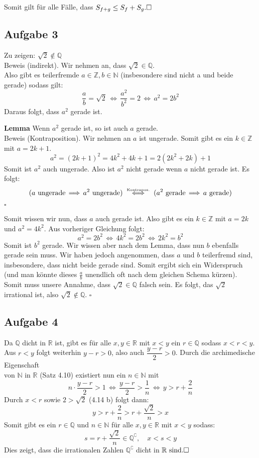 \documentclass[a4paper,graphics,11pt]{article}
\newcommand{\aufgabe}[1]{\subsection*{Aufgabe #1}}
\newcommand{\up}[2]{\mathrel{\overset{\makebox[0pt]{\mbox{\normalfont\tiny #2}}}{#1}}}
\begin{document}
Somit gilt für alle Fälle, dass $S_{f+g} \leq S_f + S_g.\hfill\square$
\aufgabe{3}
Zu zeigen: $\sqrt{2} \notin \mathbb{Q}$\\
Beweis (indirekt). Wir nehmen an, dass $\sqrt{2} \in \mathbb{Q}$.\\
Also gibt es teilerfremde $a \in \mathbb{Z} ,b \in \mathbb{N}$ (insbesondere sind nicht a und beide gerade) sodass gilt:
$$
    \frac{a}{b} = \sqrt{2} \,\Longleftrightarrow\, \frac{a^2}{b^2} = 2
    \,\Longleftrightarrow\, a^2 = 2b^2
$$
Daraus folgt, dass $a^2$ gerade ist.

\textbf{Lemma} Wenn $a^2$ gerade ist, so ist auch $a$ gerade.\\
Beweis (Kontraposition). Wir nehmen an $a$ ist ungerade. Somit gibt es ein $k \in \mathbb{Z}$ mit $a = 2k+1$.\\
$$
    a^2 = (2k+1)^2 = 4k^2+4k+1 = 2(2k^2+2k) + 1
$$
Somit ist $a^2$ auch ungerade. Also ist $a^2$ nicht gerade wenn $a$ nicht gerade ist.
Es folgt:
$$
    (a\ \text{ungerade} \,\Longrightarrow\, a^2\ \text{ungerade})
    \up{\quad\Longleftrightarrow\quad}{Kontrapos.}(a^2\ \text{gerade} \,\Longrightarrow\, a\ \text{gerade})
$$
\strut\hfill$\square$

Somit wissen wir nun, dass $a$ auch gerade ist. Also gibt es ein $k \in \mathbb{Z}$ mit
$a = 2k$ und $a^2 = 4k^2$. Aus vorheriger Gleichung folgt:
$$
    a^2 = 2b^2 \,\Longleftrightarrow\, 4k^2 = 2b^2 \,\Longleftrightarrow\, 2k^2 = b^2 
$$
Somit ist $b^2$ gerade. Wir wissen aber nach dem Lemma, dass nun $b$ ebenfalls gerade
sein muss. Wir haben jedoch angenommen, dass $a$ und $b$ teilerfremd sind, insbesondere,
dass nicht beide gerade sind.
Somit ergibt sich ein Widerspruch (und man könnte dieses $\frac{a}{b}$ unendlich oft
nach dem gleichen Schema kürzen). Somit muss unsere Annahme, dass $\sqrt{2} \in \mathbb{Q}$
falsch sein. Es folgt, das $\sqrt{2}$ irrational ist, also $\sqrt{2} \notin \mathbb{Q}$.
\hfill$\square$

\newpage

\aufgabe{4}

Da $\mathbb{Q}$ dicht in $\mathbb{R}$ ist, gibt es für alle $x,y \in\mathbb{R}$ mit $x<y$ 
ein $r \in \mathbb{Q}$ sodass $x<r<y$.\\[5pt]
Aus $r<y$ folgt weiterhin $y-r>0$, also auch $\dfrac{y-r}{2}>0$. Durch die 
archimedische Eigenschaft\\[2pt] von $\mathbb{N}$ in $\mathbb{R}$ (Satz 4.10)
existiert nun ein $n \in \mathbb{N}$ mit 
$$
    n\cdot \frac{y-r}{2}>1 \,\Longleftrightarrow\, \frac{y-r}{2} > \frac{1}{n}
    \,\Longleftrightarrow\, y > r+ \frac{2}{n}
$$
Durch $x<r$ sowie $2  > \sqrt{2}$ (4.14 b) folgt dann:
$$
    y > r + \frac{2}{n} > r+ \frac{\sqrt{2}}{n} > x
$$
Somit gibt es ein $r \in \mathbb{Q}$ und $n \in \mathbb{N}$ für alle $x,y \in \mathbb{R}$ mit
$x<y$ sodass:
$$s = r+ \frac{\sqrt{2}}{n} \in \mathbb{Q}^\complement,\quad x<s<y$$
Dies zeigt, dass die irrationalen Zahlen $\mathbb{Q}^\complement$ dicht in
$\mathbb{R}\text{ sind.}\hfill\square$
\end{document}
